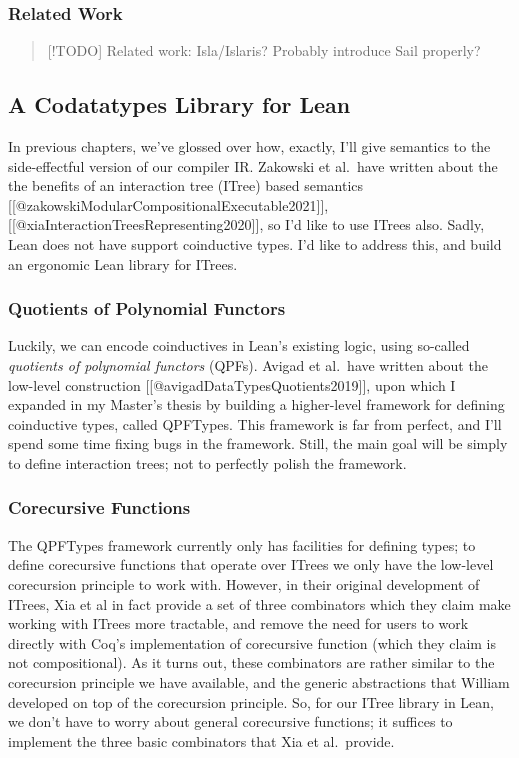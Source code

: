 \subsubsection{Related Work}\label{related-work}

\begin{quote}
{[}!TODO{]} Related work: Isla/Islaris? Probably introduce Sail
properly?
\end{quote}

\subsection{A Codatatypes Library for
Lean}\label{a-codatatypes-library-for-lean}

In previous chapters, we've glossed over how, exactly, I'll give
semantics to the side-effectful version of our compiler IR. Zakowski et
al.~have written about the the benefits of an interaction tree (ITree)
based semantics {[}{[}@zakowskiModularCompositionalExecutable2021{]}{]},
{[}{[}@xiaInteractionTreesRepresenting2020{]}{]}, so I'd like to use
ITrees also. Sadly, Lean does not have support coinductive types. I'd
like to address this, and build an ergonomic Lean library for ITrees.

\subsubsection{Quotients of Polynomial
Functors}\label{quotients-of-polynomial-functors}

Luckily, we can encode coinductives in Lean's existing logic, using
so-called \emph{quotients of polynomial functors} (QPFs). Avigad et
al.~have written about the low-level construction
{[}{[}@avigadDataTypesQuotients2019{]}{]}, upon which I expanded in my
Master's thesis by building a higher-level framework for defining
coinductive types, called QPFTypes. This framework is far from perfect,
and I'll spend some time fixing bugs in the framework. Still, the main
goal will be simply to define interaction trees; not to perfectly polish
the framework.

\subsubsection{Corecursive Functions}\label{corecursive-functions}

The QPFTypes framework currently only has facilities for defining types;
to define corecursive functions that operate over ITrees we only have
the low-level corecursion principle to work with. However, in their
original development of ITrees, Xia et al in fact provide a set of three
combinators which they claim make working with ITrees more tractable,
and remove the need for users to work directly with Coq's implementation
of corecursive function (which they claim is not compositional). As it
turns out, these combinators are rather similar to the corecursion
principle we have available, and the generic abstractions that William
developed on top of the corecursion principle. So, for our ITree library
in Lean, we don't have to worry about general corecursive functions; it
suffices to implement the three basic combinators that Xia et
al.~provide.

